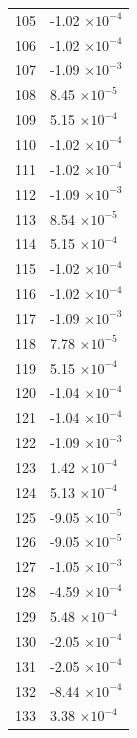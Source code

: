 \documentclass[a4paper,11pt]{article}
\begin{document}
\begin{center}
\begin{longtable}{|R{1.5cm}|R{2.5cm}|}
  105 &        -1.02 $\times 10^{          -4}$ \\
  106 &        -1.02 $\times 10^{          -4}$ \\
  107 &        -1.09 $\times 10^{          -3}$ \\
  108 &         8.45 $\times 10^{          -5}$ \\
  109 &         5.15 $\times 10^{          -4}$ \\
  110 &        -1.02 $\times 10^{          -4}$ \\
  111 &        -1.02 $\times 10^{          -4}$ \\
  112 &        -1.09 $\times 10^{          -3}$ \\
  113 &         8.54 $\times 10^{          -5}$ \\
  114 &         5.15 $\times 10^{          -4}$ \\
  115 &        -1.02 $\times 10^{          -4}$ \\
  116 &        -1.02 $\times 10^{          -4}$ \\
  117 &        -1.09 $\times 10^{          -3}$ \\
  118 &         7.78 $\times 10^{          -5}$ \\
  119 &         5.15 $\times 10^{          -4}$ \\
  120 &        -1.04 $\times 10^{          -4}$ \\
  121 &        -1.04 $\times 10^{          -4}$ \\
  122 &        -1.09 $\times 10^{          -3}$ \\
  123 &         1.42 $\times 10^{          -4}$ \\
  124 &         5.13 $\times 10^{          -4}$ \\
  125 &        -9.05 $\times 10^{          -5}$ \\
  126 &        -9.05 $\times 10^{          -5}$ \\
  127 &        -1.05 $\times 10^{          -3}$ \\
  128 &        -4.59 $\times 10^{          -4}$ \\
  129 &         5.48 $\times 10^{          -4}$ \\
  130 &        -2.05 $\times 10^{          -4}$ \\
  131 &        -2.05 $\times 10^{          -4}$ \\
  132 &        -8.44 $\times 10^{          -4}$ \\
  133 &         3.38 $\times 10^{          -4}$ \\

\end{longtable}
\end{center}
\end{document}

